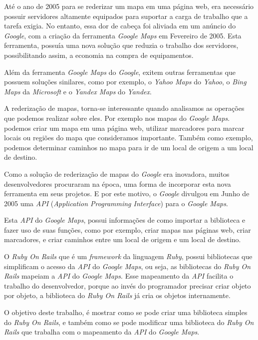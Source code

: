 Até o ano de 2005 para se rederizar um mapa em uma página web, era necessário possuir servidores
altamente equipados para suportar a carga de trabalho que a tarefa exigia. No entanto, essa dor
de cabeça foi aliviada em um anúncio do \emph{Google}, com a criação da ferramenta
\emph{Google Maps} em Fevereiro de 2005. Esta ferramenta, possuía uma nova solução que reduzia
o trabalho dos servidores, possibilitando assim, a economia na compra de equipamentos.

Além da ferramenta \emph{Google Maps} do \emph{Google}, exitem outras ferramentas que possuem
soluções sinilares, como por exemplo, o \emph{Yahoo Maps} do \emph{Yahoo}, o \emph{Bing Maps}
da \emph{Microsoft} e o \emph{Yandex Maps} do \emph{Yandex}.

A rederização de mapas, torna-se interessante quando analisamos as operações que podemos
realizar sobre eles. Por exemplo nos mapas do \emph{Google Maps}. podemos criar um mapa em
uma página web, utilizar marcadores para marcar locais ou regiões do mapa que consideramos
importante. Também como exemplo, podemos determinar caminhos no mapa para ir de um local
de origem a um local de destino.

Como a solução de rederização de mapas do \emph{Google} era inovadora, muitos
desenvolvedores procuraram na época, uma forma de incorporar esta nova ferramenta em seus
projetos. E por este motivo, o \emph{Google} divulgou em Junho de 2005 uma \emph{API}
(\emph{Application Programming Interface}) para o \emph{Google Maps}.

Esta \emph{API} do \emph{Google Maps}, possui informações de como importar a biblioteca
e fazer uso de suas funções, como por exemplo, criar mapas nas páginas web, criar
marcadores, e criar caminhos entre um local de origem e um local de destino.

O \emph{Ruby On Rails} que é um \emph{framework} da linguagem \emph{Ruby}, possui
bibliotecas que simplificam o acesso da \emph{API} do \emph{Google Maps}, ou seja,
as bibliotecas do \emph{Ruby On Rails} mapeiam a \emph{API} do \emph{Google Maps}.
Esse mapeamento da \emph{API} facilita o trabalho do desenvolvedor, porque ao invés do
programador precisar criar objeto por objeto, a biblioteca do \emph{Ruby On Rails}
já cria os objetos internamente.

O objetivo deste trabalho, é mostrar como se pode criar uma biblioteca simples do 
\emph{Ruby On Rails}, e também como se pode modificar uma biblioteca
do \emph{Ruby On Rails} que trabalha com o mapeamento da \emph{API} do
\emph{Google Maps}.

